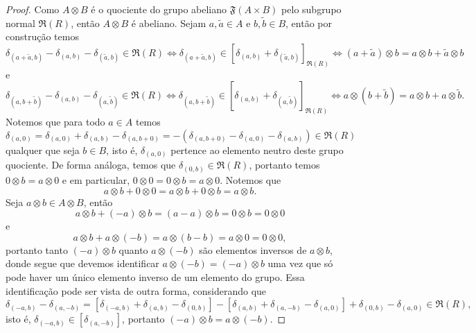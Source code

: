 \begin{proof}
    Como \(A\otimes B\) é o quociente do grupo abeliano \(\mathfrak{F}(A \times B)\) pelo subgrupo normal \(\mathfrak{R}(R)\), então \(A \otimes B\) é abeliano. Sejam \(a, \tilde{a} \in A\) e \(b, \tilde{b} \in B\), então por construção temos
    \begin{equation*}
        \delta_{(a + \tilde{a}, b)} - \delta_{(a,b)} - \delta_{(\tilde{a}, b)} \in \mathfrak{R}(R) \iff \delta_{(a + \tilde{a}, b)} \in [\delta_{(a,b)} + \delta_{(\tilde{a},b)}]_{\mathfrak{R}(R)} \iff (a + \tilde{a})\otimes b = a\otimes b + \tilde{a} \otimes b
    \end{equation*}
    e
    \begin{equation*}
        \delta_{(a, b + \tilde{b})} - \delta_{(a,b)} - \delta_{(a, \tilde{b})} \in \mathfrak{R}(R) \iff \delta_{(a, b + \tilde{b})} \in [\delta_{(a,b)} + \delta_{(a, \tilde{b})}]_{\mathfrak{R}(R)} \iff a\otimes (b+\tilde{b}) = a\otimes b + a \otimes \tilde{b}.
    \end{equation*}
    Notemos que para todo \(a \in A\) temos
    \begin{equation*}
        \delta_{(a, 0)} = \delta_{(a, 0)} + \delta_{(a, b)} - \delta_{(a, b + 0)} = -\left(\delta_{(a,b + 0)} - \delta_{(a,0)} - \delta_{(a,b)}\right) \in \mathfrak{R}(R)
    \end{equation*}
    qualquer que seja \(b \in B\), isto é, \(\delta_{(a,0)}\) pertence ao elemento neutro deste grupo quociente. De forma análoga, temos que \(\delta_{(0,b)} \in \mathfrak{R}(R)\), portanto temos \(0 \otimes b = a \otimes 0\) e em particular, \(0 \otimes 0 = 0 \otimes b = a \otimes 0\). Notemos que
    \begin{equation*}
        a \otimes b + 0 \otimes 0 = a \otimes b + 0 \otimes b = a \otimes b.
    \end{equation*}
    Seja \(a \otimes b \in A \otimes B\), então
    \begin{equation*}
        a \otimes b + (-a) \otimes b = (a - a) \otimes b = 0 \otimes b = 0\otimes 0
    \end{equation*}
    e
    \begin{equation*}
        a \otimes b + a \otimes (-b) = a \otimes (b - b) = a \otimes 0 = 0 \otimes 0,
    \end{equation*}
    portanto tanto \((-a) \otimes b\) quanto \(a \otimes (-b)\) são elementos inversos de \(a \otimes b\), donde segue que devemos identificar \(a \otimes (-b) = (-a)\otimes b\) uma vez que só pode haver um único elemento inverso de um elemento do grupo. Essa identificação pode ser vista de outra forma, considerando que
    \begin{equation*}
        \delta_{(-a, b)} - \delta_{(a, -b)} = \left[\delta_{(-a, b)} + \delta_{(a,b)} - \delta_{(0,b)}\right] - \left[\delta_{(a,b)} + \delta_{(a, -b)} - \delta_{(a,0)}\right] + \delta_{(0,b)} - \delta_{(a, 0)} \in \mathfrak{R}(R),
    \end{equation*}
    isto é, \(\delta_{(-a, b)} \in [\delta_{(a, -b)}]\), portanto \((-a)\otimes b = a\otimes(-b)\).


\end{proof}

